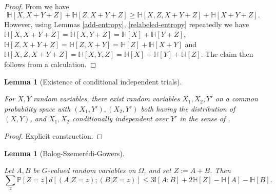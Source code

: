 \documentclass[10pt,a4paper]{article}
\newtheorem{lemma}[theorem]{Lemma}
\newcommand{\lean}[1]{}
\newcommand{\uses}[1]{}
\newcommand{\leanok}{}
\newcommand{\bbH}{\mathbb{H}}
\newcommand{\bbP}{\mathbb{P}}
\newcommand{\bbI}{\mathbb{I}}
\begin{document}
\begin{proof}\uses{submodularity, add-entropy, relabeled-entropy}\leanok
From  we have
$$ \bbH[X, X + Y+ Z] + \bbH[Z, X + Y+ Z] \geq \bbH[X, Z, X + Y+ Z] + \bbH[X + Y+ Z].$$
However, using Lemmas \ref{add-entropy}, \ref{relabeled-entropy} repeatedly we have $\bbH[X, X + Y+ Z] = \bbH[X, Y+ Z] = \bbH[X] + \bbH[Y+ Z]$, $\bbH[Z, X + Y + Z] = \bbH[Z, X + Y] = \bbH[Z] + \bbH[X + Y]$ and $\bbH[X, Z, X + Y+ Z] = \bbH[X, Y, Z] = \bbH[X] + \bbH[Y] + \bbH[Z]$.  The claim then follows from a calculation.
\end{proof}

\begin{lemma}[Existence of conditional independent trials]\label{cond-indep-exist}
  \uses{conditional-independent-def}
  \lean{ProbabilityTheory.condIndep_copies}\leanok
  For $X,Y$ random variables, there exist random variables $X_1,X_2,Y'$ on a common probability space with $(X_1, Y'), (X_2, Y')$ both having the distribution of $(X,Y)$, and $X_1, X_2$ conditionally independent over $Y'$ in the sense of .
\end{lemma}

\begin{proof}\leanok Explicit construction.
\end{proof}


\begin{lemma}[Balog-Szemer\'edi-Gowers]\label{entropic-bsg}
  \lean{ent_bsg}\leanok
  Let $A,B$ be $G$-valued random variables on $\Omega$, and set $Z := A+B$.
Then
\begin{equation}\label{2-bsg-takeaway} \sum_{z}  \bbP[Z=z] d[(A | Z = z); (B | Z = z)] \leq 3  \bbI[A:B] + 2 \bbH[Z] - \bbH[A] - \bbH[B]. \end{equation}
\end{lemma}
\end{document}
